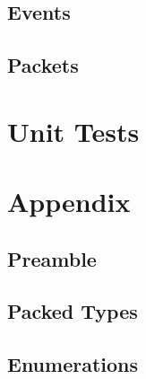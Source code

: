 

\subsection{Events}



\subsection{Packets}



\section{Unit Tests}



\section{Appendix}
\subsection{Preamble}



\subsection{Packed Types}



\subsection{Enumerations}




